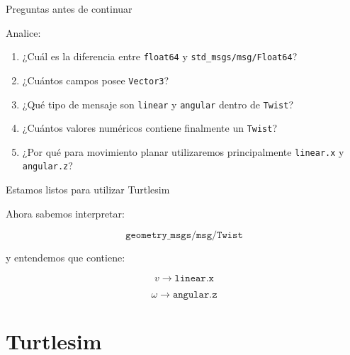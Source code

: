 \documentclass[aspectratio=169]{beamer}
\begin{document}
\begin{frame}{Preguntas antes de continuar}

    Analice:

    \begin{enumerate}
        \item ¿Cuál es la diferencia entre \texttt{float64} y
        \texttt{std\_msgs/msg/Float64}?

        \item ¿Cuántos campos posee \texttt{Vector3}?

        \item ¿Qué tipo de mensaje son \texttt{linear} y \texttt{angular}
        dentro de \texttt{Twist}?

        \item ¿Cuántos valores numéricos contiene finalmente un \texttt{Twist}?

        \item ¿Por qué para movimiento planar utilizaremos principalmente
        \texttt{linear.x} y \texttt{angular.z}?
    \end{enumerate}

\end{frame}

\begin{frame}{Estamos listos para utilizar Turtlesim}

    Ahora sabemos interpretar:

    \[
    \texttt{geometry\_msgs/msg/Twist}
    \]

    y entendemos que contiene:

    \[
    \boxed{
        v \rightarrow \texttt{linear.x}
    }
    \]

    \[
    \boxed{
        \omega \rightarrow \texttt{angular.z}
    }
    \]

    \vspace{0.3cm}


\end{frame}

\section{Turtlesim}
\end{document}
